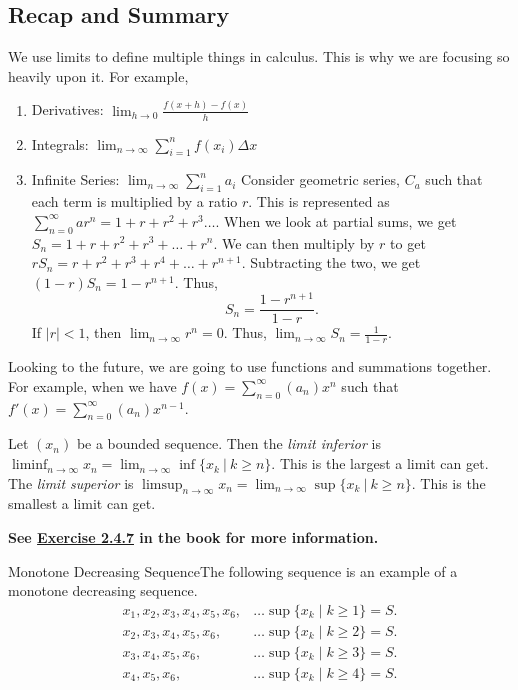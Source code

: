 \subsection{Recap and Summary}

We use limits to define multiple things in calculus. This is why we are focusing so heavily upon it. For example,

\begin{enumerate}
    \item Derivatives: \(\lim_{h \to 0} \frac{f(x + h) - f(x)}{h}\)
    \item Integrals: \(\lim_{n \to \infty} \sum_{i = 1}^{n} f(x_i) \Delta x\)
    \item Infinite Series: \(\lim_{n \to \infty} \sum_{i = 1}^{n} a_i\)
          Consider geometric series, \(C_a\) such that each term is multiplied by a ratio \(r\). This is represented as \(\sum_{n=0}^\infty ar^n = 1 + r + r^2 + r^3\dots\). When we look at partial sums, we get \(S_n = 1 + r + r^2 + r^3 + \dots + r^n\). We can then multiply by \(r\) to get \(rS_n = r + r^2 + r^3 + r^4 + \dots + r^{n+1}\). Subtracting the two, we get \((1 - r)S_n = 1 - r^{n+1}\). Thus, \[S_n = \frac{1 - r^{n+1}}{1 - r}.\] If \(|r| < 1\), then \(\lim_{n \to \infty} r^n = 0\). Thus, \(\lim_{n \to \infty} S_n = \frac{1}{1 - r}\).
\end{enumerate}

Looking to the future, we are going to use functions and summations together. For example, when we have \(f(x) = \sum_{n=0}^\infty (a_n)x^n\) such that \(f'(x) = \sum_{n=0}^\infty (a_n)x^{n-1}\).



\begin{definition}
    Let \((x_n)\) be a bounded sequence. Then the \textit{limit inferior} is \(\liminf_{n \to \infty} x_n = \lim_{n \to \infty} \inf\{x_k \ | \ k \geq n\}\). This is the largest a limit can get. The \textit{limit superior} is \(\limsup_{n \to \infty} x_n = \lim_{n \to \infty} \sup\{x_k \ | \ k \geq n\}\). This is the smallest a limit can get.
\end{definition}

\textbf{See \hyperref[ex:2.4.7]{Exercise 2.4.7} in the book for more information.}

\begin{example}
    {Monotone Decreasing Sequence}The following sequence is an example of a monotone decreasing sequence.
    \begin{align*}
        x_1, x_2, x_3, x_4, x_5, x_6, & \dots \sup\{x_k \mid k \geq 1\} = S. \\
        x_2, x_3, x_4, x_5, x_6,      & \dots \sup\{x_k \mid k \geq 2\} = S. \\
        x_3, x_4, x_5, x_6,           & \dots \sup\{x_k \mid k \geq 3\} = S. \\
        x_4, x_5, x_6,                & \dots \sup\{x_k \mid k \geq 4\} = S.
    \end{align*}
\end{example}

